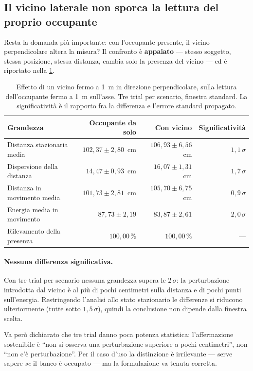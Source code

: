 \subsection{Il vicino laterale non sporca la lettura del proprio occupante}

Resta la domanda più importante: con l'occupante presente, il vicino perpendicolare
altera la misura? Il confronto è \textbf{appaiato} --- stesso soggetto, stessa
posizione, stessa distanza, cambia solo la presenza del vicino --- ed è riportato
nella \cref{tab:vicino}.

\begin{table}[htbp]
\centering
\caption{Effetto di un vicino fermo a 1~m in direzione perpendicolare, sulla lettura
dell'occupante fermo a 1~m sull'asse. Tre trial per scenario, finestra standard. La
significatività è il rapporto fra la differenza e l'errore standard propagato.}
\label{tab:vicino}
\small
\begin{tabular}{@{}lrrr@{}}
\toprule
\textbf{Grandezza} & \textbf{Occupante da solo} & \textbf{Con vicino} &
\textbf{Significatività} \\
\midrule
Distanza stazionaria media & $102{,}37 \pm 2{,}80$~cm & $106{,}93 \pm 6{,}56$~cm & $1{,}1\,\sigma$ \\
Dispersione della distanza & $14{,}47 \pm 0{,}93$~cm & $16{,}07 \pm 1{,}31$~cm & $1{,}7\,\sigma$ \\
Distanza in movimento media & $101{,}73 \pm 2{,}81$~cm & $105{,}70 \pm 6{,}75$~cm & $0{,}9\,\sigma$ \\
Energia media in movimento & $87{,}73 \pm 2{,}19$ & $83{,}87 \pm 2{,}61$ & $2{,}0\,\sigma$ \\
Rilevamento della presenza & $100{,}00\,\%$ & $100{,}00\,\%$ & --- \\
\bottomrule
\end{tabular}
\end{table}

\paragraph{Nessuna differenza significativa.} Con tre trial per scenario nessuna
grandezza supera le $2\,\sigma$: la perturbazione introdotta dal vicino è al più di
pochi centimetri sulla distanza e di pochi punti sull'energia. Restringendo l'analisi
allo stato stazionario le differenze si riducono ulteriormente (tutte sotto
$1{,}5\,\sigma$), quindi la conclusione non dipende dalla finestra scelta.

Va però dichiarato che tre trial danno poca potenza statistica: l'affermazione
sostenibile è ``non si osserva una perturbazione superiore a pochi centimetri'', non
``non c'è perturbazione''. Per il caso d'uso la distinzione è irrilevante --- serve
sapere \emph{se} il banco è occupato --- ma la formulazione va tenuta corretta.

